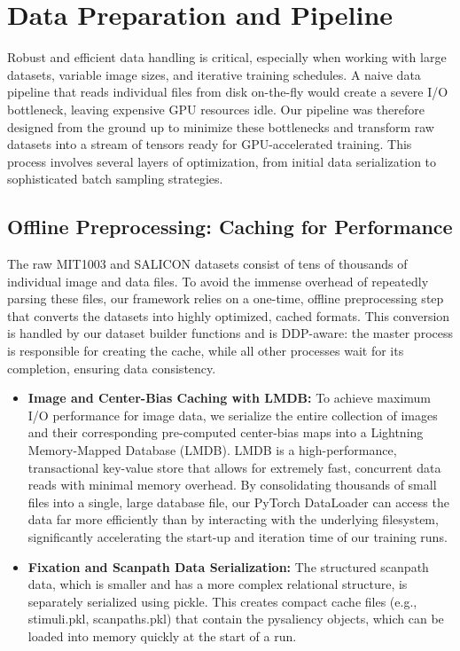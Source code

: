 \section{Data Preparation and Pipeline}
\label{sec:impl_data_pipeline}
Robust and efficient data handling is critical, especially when working with large datasets, variable image sizes, and iterative training schedules. A naive data pipeline that reads individual files from disk on-the-fly would create a severe I/O bottleneck, leaving expensive GPU resources idle. Our pipeline was therefore designed from the ground up to minimize these bottlenecks and transform raw datasets into a stream of tensors ready for GPU-accelerated training. This process involves several layers of optimization, from initial data serialization to sophisticated batch sampling strategies.
\subsection{Offline Preprocessing: Caching for Performance}
\label{sec:impl_caching}
The raw MIT1003 and SALICON datasets consist of tens of thousands of individual image and data files. To avoid the immense overhead of repeatedly parsing these files, our framework relies on a one-time, offline preprocessing step that converts the datasets into highly optimized, cached formats. This conversion is handled by our dataset builder functions and is DDP-aware: the master process is responsible for creating the cache, while all other processes wait for its completion, ensuring data consistency.
\begin{itemize}
\item \textbf{Image and Center-Bias Caching with LMDB:} To achieve maximum I/O performance for image data, we serialize the entire collection of images and their corresponding pre-computed center-bias maps into a Lightning Memory-Mapped Database (LMDB). LMDB is a high-performance, transactional key-value store that allows for extremely fast, concurrent data reads with minimal memory overhead. By consolidating thousands of small files into a single, large database file, our PyTorch DataLoader can access the data far more efficiently than by interacting with the underlying filesystem, significantly accelerating the start-up and iteration time of our training runs.
\item \textbf{Fixation and Scanpath Data Serialization:} The structured scanpath data, which is smaller and has a more complex relational structure, is separately serialized using pickle. This creates compact cache files (e.g., stimuli.pkl, scanpaths.pkl) that contain the pysaliency objects, which can be loaded into memory quickly at the start of a run.
\end{itemize}
